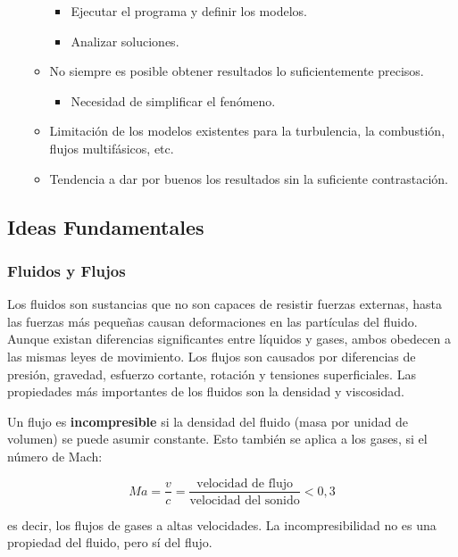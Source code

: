 \begin{itemize}
\begin{itemize}
    \begin{itemize}
    \item
      Ejecutar el programa y definir los modelos.
    \item
      Analizar soluciones.
    \end{itemize}
  \item
    No siempre es posible obtener resultados lo suficientemente
    precisos.

    \begin{itemize}
    \item
      Necesidad de simplificar el fenómeno.
    \end{itemize}
  \item
    Limitación de los modelos existentes para la turbulencia, la
    combustión, flujos multifásicos, etc.
  \item
    Tendencia a dar por buenos los resultados sin la suficiente
    contrastación.
  \end{itemize}
\end{itemize}

\subsection{Ideas Fundamentales}\label{header-n109}

\subsubsection{Fluidos y Flujos}\label{header-n110}

Los fluidos son sustancias que no son capaces de resistir fuerzas
externas, hasta las fuerzas más pequeñas causan deformaciones en las
partículas del fluido. Aunque existan diferencias significantes entre
líquidos y gases, ambos obedecen a las mismas leyes de movimiento. Los
flujos son causados por diferencias de presión, gravedad, esfuerzo
cortante, rotación y tensiones superficiales. Las propiedades más
importantes de los fluidos son la densidad y viscosidad.

Un flujo es \textbf{incompresible} si la densidad del fluido (masa por
unidad de volumen) se puede asumir constante. Esto también se aplica a
los gases, si el número de Mach:

\[Ma=\frac{v}{c}=\frac {\text{velocidad de flujo}}{\text{velocidad del sonido}} < 0,3\]

es decir, los flujos de gases a altas velocidades. La incompresibilidad
no es una propiedad del fluido, pero sí del flujo.

